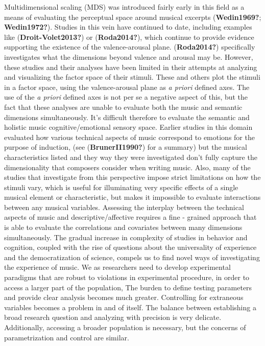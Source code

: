 \documentclass[
  english,
  man,floatsintext]{apa6}
\begin{document}
Multidimensional scaling (MDS) was introduced fairly early in this field as a means of evaluating the perceptual space around musical excerpts (\textbf{Wedin1969?}; \textbf{Wedin1972?}). Studies in this vein have continued to date, including examples like (\textbf{Droit-Volet2013?}) or (\textbf{Roda2014?}), which continue to provide evidence supporting the existence of the valence-arousal plane. (\textbf{Roda2014?}) specifically investigates what the dimensions beyond valence and arousal may be. However, these studies and their analyses have been limited in their attempts at analyzing and visualizing the factor space of their stimuli. These and others plot the stimuli in a factor space, using the valence-arousal plane as \emph{a priori} defined axes. The use of the \emph{a priori} defined axes is not per se a negative aspect of this, but the fact that these analyses are unable to evaluate both the music and semantic dimensions simultaneously. It's difficult therefore to evaluate the semantic and holistic music cognitive/emotional sensory space.
Earlier studies in this domain evaluated how various technical aspects of music correspond to emotions for the purpose of induction, (see (\textbf{BrunerII1990?}) for a summary) but the musical characteristics listed and they way they were investigated don't fully capture the dimensionality that composers consider when writing music. Also, many of the studies that investigate from this perspective impose strict limitations on how the stimuli vary, which is useful for illuminating very specific effects of a single musical element or characteristic, but makes it impossible to evaluate interactions between any musical variables. Assessing the interplay between the technical aspects of music and descriptive/affective requires a fine - grained approach that is able to evaluate the correlations and covariates between many dimensions simultaneously.
The gradual increase in complexity of studies in behavior and cognition, coupled with the rise of questions about the universality of experience and the democratization of science, compels us to find novel ways of investigating the experience of music. We as researchers need to develop experimental paradigms that are robust to violations in experimental procedure, in order to access a larger part of the population, The burden to define testing parameters and provide clear analysis becomes much greater. Controlling for extraneous variables becomes a problem in and of itself. The balance between establishing a broad research question and analyzing with precision is very delicate. Additionally, accessing a broader population is necessary, but the concerns of parametrization and control are similar.
\end{document}
